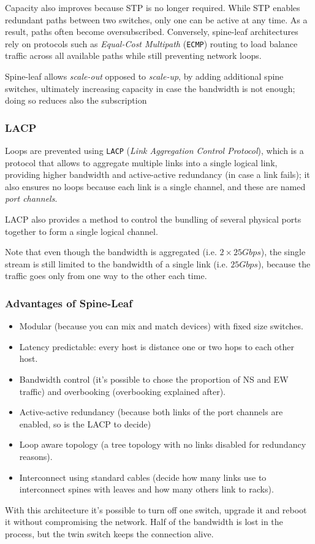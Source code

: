 Capacity also improves because STP is no longer required. While STP enables redundant paths between two switches, only one can be active at any time. As a result, paths often become oversubscribed. 
Conversely, spine-leaf architectures rely on protocols such as \textit{Equal-Cost Multipath} (\texttt{ECMP}) routing to load balance traffic across all available paths while still preventing network loops.

Spine-leaf allows \textit{scale-out} opposed to \textit{scale-up}, by adding additional spine switches, ultimately increasing capacity in case the bandwidth is not enough; doing so reduces also the subscription

\subsubsection{LACP}
\label{sec:LACP}
Loops are prevented using \texttt{LACP} (\textit{Link Aggregation Control Protocol}), which is a protocol that allows to aggregate multiple links into a single logical link, providing higher bandwidth and active-active redundancy (in case a link fails);
it also ensures no loops because each link is a single channel, and these are named \textit{port channels}.

LACP also provides a method to control the bundling of several physical ports together to form a single logical channel.

Note that even though the bandwidth is aggregated (i.e. $2\times 25Gbps$), the single stream is still limited to the bandwidth of a single link (i.e. $25Gbps$), because the traffic goes only from one way to the other each time.

\subsubsection{Advantages of Spine-Leaf}

\begin{itemize}
   \item Modular (because you can mix and match devices) with fixed size switches.
   \item Latency predictable: every host is distance one or two hops to each other host.
   \item Bandwidth control (it's possible to chose the proportion of NS and EW traffic) and overbooking (overbooking explained after).
   \item Active-active redundancy (because both links of the port channels are enabled, so is the LACP to decide)
   \item Loop aware topology (a tree topology with no links disabled for redundancy reasons).
   \item Interconnect using standard cables (decide how many links use to interconnect spines with leaves and how many others link to racks).
   
\end{itemize}
With this architecture it’s possible to turn off one switch, upgrade it and reboot it without compromising the network. Half of the bandwidth is lost in the process, but the twin switch keeps the connection alive.

